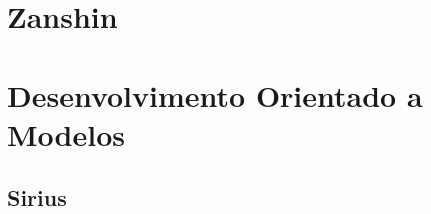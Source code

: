 

\section{Zanshin}
\label{sec-referencial-engenharia-software-atividade-desenvolvimento-projeto}





\section{Desenvolvimento Orientado a Modelos}

\subsection{Sirius}

